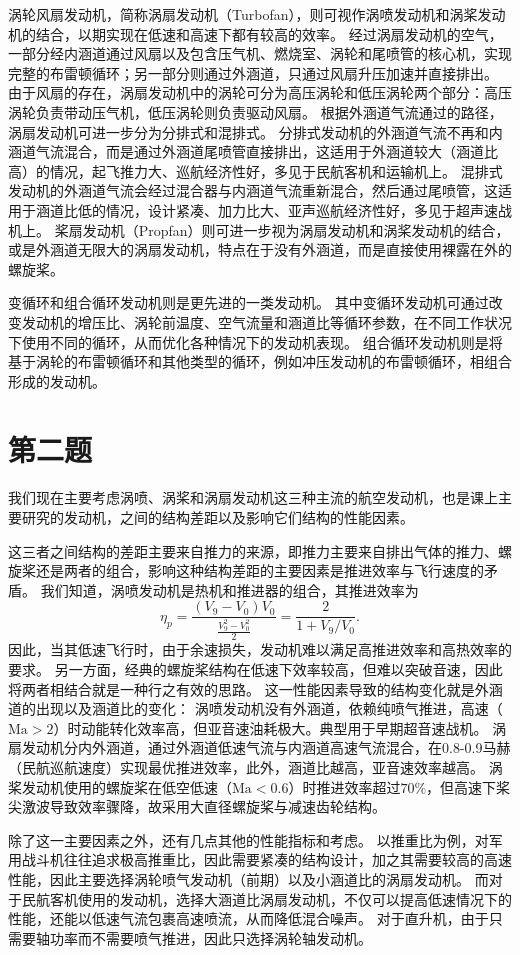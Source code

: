 涡轮风扇发动机，简称涡扇发动机（Turbofan），则可视作涡喷发动机和涡桨发动机的结合，以期实现在低速和高速下都有较高的效率。
经过涡扇发动机的空气，一部分经内涵道通过风扇以及包含压气机、燃烧室、涡轮和尾喷管的核心机，实现完整的布雷顿循环；另一部分则通过外涵道，只通过风扇升压加速并直接排出。
由于风扇的存在，涡扇发动机中的涡轮可分为高压涡轮和低压涡轮两个部分：高压涡轮负责带动压气机，低压涡轮则负责驱动风扇。
根据外涵道气流通过的路径，涡扇发动机可进一步分为分排式和混排式。
分排式发动机的外涵道气流不再和内涵道气流混合，而是通过外涵道尾喷管直接排出，这适用于外涵道较大（涵道比高）的情况，起飞推力大、巡航经济性好，多见于民航客机和运输机上。
混排式发动机的外涵道气流会经过混合器与内涵道气流重新混合，然后通过尾喷管，这适用于涵道比低的情况，设计紧凑、加力比大、亚声巡航经济性好，多见于超声速战机上。
桨扇发动机（Propfan）则可进一步视为涡扇发动机和涡桨发动机的结合，或是外涵道无限大的涡扇发动机，特点在于没有外涵道，而是直接使用裸露在外的螺旋桨。

变循环和组合循环发动机则是更先进的一类发动机。
其中变循环发动机可通过改变发动机的增压比、涡轮前温度、空气流量和涵道比等循环参数，在不同工作状况下使用不同的循环，从而优化各种情况下的发动机表现。
组合循环发动机则是将基于涡轮的布雷顿循环和其他类型的循环，例如冲压发动机的布雷顿循环，相组合形成的发动机。

\section{第二题}
我们现在主要考虑涡喷、涡桨和涡扇发动机这三种主流的航空发动机，也是课上主要研究的发动机，之间的结构差距以及影响它们结构的性能因素。

这三者之间结构的差距主要来自推力的来源，即推力主要来自排出气体的推力、螺旋桨还是两者的组合，影响这种结构差距的主要因素是推进效率与飞行速度的矛盾。
我们知道，涡喷发动机是热机和推进器的组合，其推进效率为
\begin{equation}
    \eta_p = \frac{(V_9 - V_0)V_0}{\frac{V_9^2 - V_0^2}{2}} = \frac{2}{1 + V_9 / V_0}.
\end{equation}
因此，当其低速飞行时，由于余速损失，发动机难以满足高推进效率和高热效率的要求。
另一方面，经典的螺旋桨结构在低速下效率较高，但难以突破音速，因此将两者相结合就是一种行之有效的思路。
这一性能因素导致的结构变化就是外涵道的出现以及涵道比的变化：
涡喷发动机没有外涵道，依赖纯喷气推进，高速（$\mathrm{Ma}>2$）时动能转化效率高，但亚音速油耗极大。典型用于早期超音速战机。
涡扇发动机分内外涵道，通过外涵道低速气流与内涵道高速气流混合，在0.8-0.9马赫（民航巡航速度）实现最优推进效率，此外，涵道比越高，亚音速效率越高。
涡桨发动机使用的螺旋桨在低空低速（$\mathrm{Ma}<0.6$）时推进效率超过$70\%$，但高速下桨尖激波导致效率骤降，故采用大直径螺旋桨与减速齿轮结构。

除了这一主要因素之外，还有几点其他的性能指标和考虑。
以推重比为例，对军用战斗机往往追求极高推重比，因此需要紧凑的结构设计，加之其需要较高的高速性能，因此主要选择涡轮喷气发动机（前期）以及小涵道比的涡扇发动机。
而对于民航客机使用的发动机，选择大涵道比涡扇发动机，不仅可以提高低速情况下的性能，还能以低速气流包裹高速喷流，从而降低混合噪声。
对于直升机，由于只需要轴功率而不需要喷气推进，因此只选择涡轮轴发动机。
